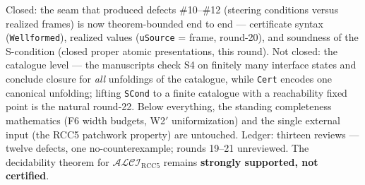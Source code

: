 \documentclass[11pt]{article}
\newcommand{\ALCIRCC}{\mathcal{ALCI}_{\mathrm{RCC5}}}
\newcommand{\code}[1]{\texttt{#1}}
\begin{document}
Closed: the seam that produced defects \#10--\#12 (steering conditions
versus realized frames) is now theorem-bounded end to end ---
certificate syntax (\code{Wellformed}), realized values
(\code{uSource} = frame, round-20), and soundness of the S-condition
(closed proper atomic presentations, this round).  Not closed: the
catalogue level --- the manuscripts check S4 on finitely many
interface states and conclude closure for \emph{all} unfoldings of the
catalogue, while \code{Cert} encodes one canonical unfolding; lifting
\code{SCond} to a finite catalogue with a reachability fixed point is
the natural round-22.  Below everything, the standing completeness
mathematics (F6 width budgets, W2$'$ uniformization) and the single
external input (the RCC5 patchwork property) are untouched.  Ledger:
thirteen reviews --- twelve defects, one no-counterexample; rounds
19--21 unreviewed.  The decidability theorem for $\ALCIRCC$ remains
\textbf{strongly supported, not certified}.
\end{document}
